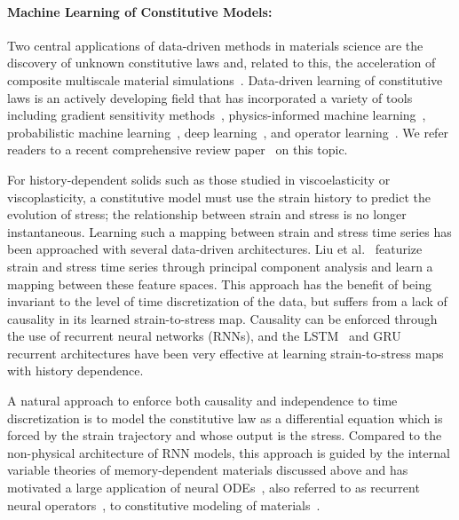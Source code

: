 \paragraph{Machine Learning of Constitutive Models:}
Two central applications of data-driven methods in materials science are the discovery of unknown constitutive laws and, related to this, the acceleration of composite multiscale material simulations~\cite{liu2021review}. Data-driven learning of constitutive laws is an actively developing field that has incorporated a variety of tools including gradient sensitivity methods~\cite{akerson2024learning}, physics-informed machine learning~\cite{haghighat2023constitutive}, probabilistic machine learning~\cite{fuhg2022physics}, deep learning~\cite{liu2019deep}, and operator learning~\cite{bhattacharya2024learning}. We refer readers to a recent comprehensive review paper~\cite{fuhg2024review} on this topic.

For history-dependent solids such as those studied in viscoelasticity or viscoplasticity, a constitutive model must use the strain history to predict the evolution of stress; the relationship between strain and stress is no longer instantaneous. Learning such a mapping between strain and stress time series has been approached with several data-driven architectures. Liu et al.~\cite{liu2022learning} featurize strain and stress time series through principal component analysis and learn a mapping between these feature spaces. This approach has the benefit of being invariant to the level of time discretization of the data, but suffers from a lack of causality in its learned strain-to-stress map. Causality can be enforced through the use of recurrent neural networks (RNNs), and the LSTM~\cite{ghavamian2019accelerating} and  GRU~\cite{mozaffar2019deep} recurrent architectures have been very effective at learning strain-to-stress maps with history dependence.

A natural approach to enforce both causality and independence to time discretization is to model the constitutive law as a differential equation which is forced by the strain trajectory and whose output is the stress. Compared to the non-physical architecture of RNN models, this approach is guided by the internal variable theories of memory-dependent materials discussed above and has motivated a large application of neural ODEs~\cite{chen2018neural, jones2022neural}, also referred to as recurrent neural operators~\cite{liu2023learning}, to constitutive modeling of materials~\cite{bhattacharya2023learning, jones2022neural, karimi2024learning, liu2023learning, zhang2024iterated}.~\\


